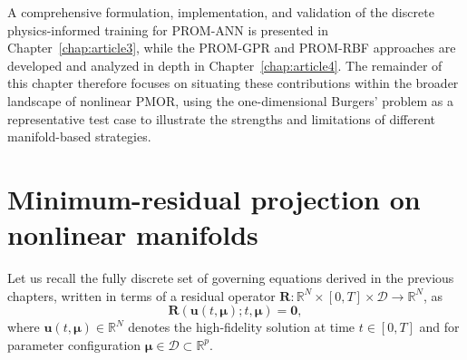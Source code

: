A comprehensive formulation, implementation, and validation of the discrete physics-informed training for PROM-ANN is presented in Chapter~\ref{chap:article3}, while the PROM-GPR and PROM-RBF approaches are developed and analyzed in depth in Chapter~\ref{chap:article4}. The remainder of this chapter therefore focuses on situating these contributions within the broader landscape of nonlinear PMOR, using the one-dimensional Burgers' problem as a representative test case to illustrate the strengths and limitations of different manifold-based strategies.




\section{Minimum-residual projection on nonlinear manifolds}
\label{subsec:minres-manifold-rom}

Let us recall the fully discrete set of governing equations derived in the previous chapters, written in terms of a residual operator \( \mathbf{R}: \mathbb{R}^{N} \times [0, T] \times \mathcal{D} \rightarrow \mathbb{R}^{N} \), as
\begin{equation}
\mathbf{R}(\mathbf{u}(t, \boldsymbol{\mu}); t, \boldsymbol{\mu}) = \mathbf{0},
\label{eq:residual_discrete_manifold}
\end{equation}
where \( \mathbf{u}(t, \boldsymbol{\mu}) \in \mathbb{R}^{N} \) denotes the high-fidelity solution at time \( t \in [0, T] \) and for parameter configuration \( \boldsymbol{\mu} \in \mathcal{D} \subset \mathbb{R}^p \).

